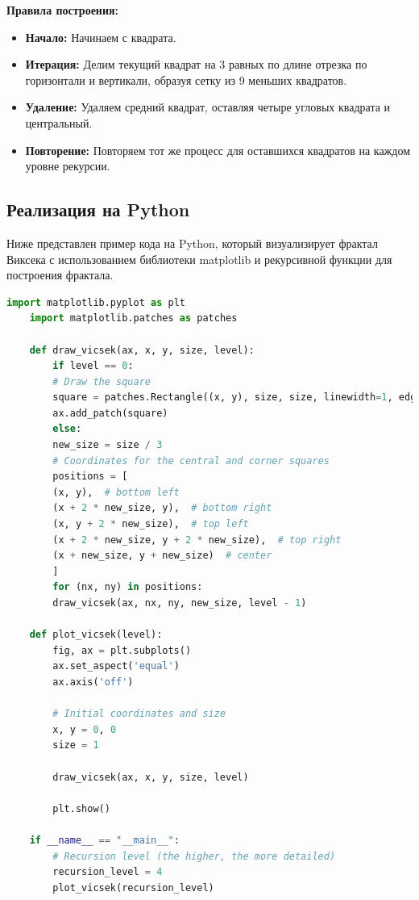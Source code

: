 \documentclass{article}
\begin{document}
	\textbf{Правила построения:}
	
	\begin{itemize}
		\item \textbf{Начало:} Начинаем с квадрата.
		\item \textbf{Итерация:} Делим текущий квадрат на 3 равных по длине отрезка по горизонтали и вертикали, образуя сетку из 9 меньших квадратов.
		\item \textbf{Удаление:} Удаляем средний квадрат, оставляя четыре угловых квадрата и центральный.
		\item \textbf{Повторение:} Повторяем тот же процесс для оставшихся квадратов на каждом уровне рекурсии.
	\end{itemize}
	
	\subsection{Реализация на Python}
	Ниже представлен пример кода на Python, который визуализирует фрактал Виксека с использованием библиотеки matplotlib и рекурсивной функции для построения фрактала.
	
\begin{lstlisting}[language=Python, inputencoding=utf8]
	import matplotlib.pyplot as plt
	import matplotlib.patches as patches
	
	def draw_vicsek(ax, x, y, size, level):
		if level == 0:
		# Draw the square
		square = patches.Rectangle((x, y), size, size, linewidth=1, edgecolor='black', 	facecolor='black')
		ax.add_patch(square)
		else:
		new_size = size / 3
		# Coordinates for the central and corner squares
		positions = [
		(x, y),  # bottom left
		(x + 2 * new_size, y),  # bottom right
		(x, y + 2 * new_size),  # top left
		(x + 2 * new_size, y + 2 * new_size),  # top right
		(x + new_size, y + new_size)  # center
		]
		for (nx, ny) in positions:
		draw_vicsek(ax, nx, ny, new_size, level - 1)
	
	def plot_vicsek(level):
		fig, ax = plt.subplots()
		ax.set_aspect('equal')
		ax.axis('off')
		
		# Initial coordinates and size
		x, y = 0, 0
		size = 1
	
		draw_vicsek(ax, x, y, size, level)
	
		plt.show()
	
	if __name__ == "__main__":
		# Recursion level (the higher, the more detailed)
		recursion_level = 4
		plot_vicsek(recursion_level)
	
\end{lstlisting}
	
\end{document}
